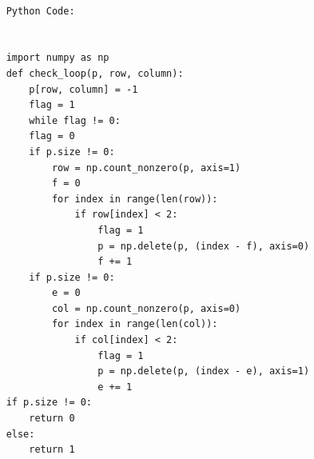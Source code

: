 \documentclass[12pt, letterpaper, twoside]{book}
\begin{document}
\begin{lstlisting}

	Python Code:
	
	
	import numpy as np
	def check_loop(p, row, column):
		p[row, column] = -1
		flag = 1
		while flag != 0:
        flag = 0
        if p.size != 0:
            row = np.count_nonzero(p, axis=1)
            f = 0
            for index in range(len(row)):
                if row[index] < 2:
                    flag = 1
                    p = np.delete(p, (index - f), axis=0)
                    f += 1
        if p.size != 0:
            e = 0
            col = np.count_nonzero(p, axis=0)
            for index in range(len(col)):
                if col[index] < 2:
                    flag = 1
                    p = np.delete(p, (index - e), axis=1)
                    e += 1
    if p.size != 0:
        return 0
    else:
        return 1



\end{lstlisting}
\end{document}
